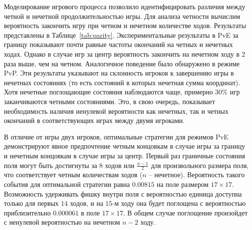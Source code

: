 Моделирование игрового процесса позволило идентифицировать различия между четной и нечетной продолжительностью игры. Для анализа четности вычислим вероятность закончить игру при четном и нечетном количестве ходов. Результаты представлены в Таблице~\cref{tab:parity}. Экспериментальные результаты в PvE за границу показывают почти равные частоты окончаний на четных и нечетных ходах. Однако в случае игр за центр вероятность закончить на нечетном ходу в $2$ раза выше, чем на четном. Аналогичное поведение было обнаружено в режиме PvP. Эти результаты указывают на склонность игроков к завершению игры в нечетных состояниях (то есть состояний в которых нечетная сумма координат). Хотя нечетные поглощающие состояния наблюдаются чаще, примерно $30\%$ игр заканчиваются четными состояниями. Это, в свою очередь, показывает необходимость наличия ненулевой вероятности как нечетных, так и четных окончаний в соответствующих играх между двумя игроками.

В отличие от игры двух игроков, оптимальные стратегии для режимов PvE демонстрируют явное предпочтение четным концовкам в случае игры за границу и нечетным концовкам в случае игры за центр. Первый раз граничные состояния поля могут быть достигнуты за $8$ ходов или $\frac{n-1}{2}$ для произвольного размера поля, что соответствует четным количествам ходов ($n$ -- нечетное). Вероятность такого события для оптимальной стратегии равна $0.00815$ на поле размером $17 \times 17$. Возможность удерживать фишку внутри поля с вероятностью единица доступна только для первых $14$ ходов, и на $15$-м ходу она будет поглощена с вероятностью приблизительно $0.000061$ в поле $17 \times 17$. В общем случае поглощение произойдет с ненулевой вероятностью на нечетном $n-2$ ходу.

